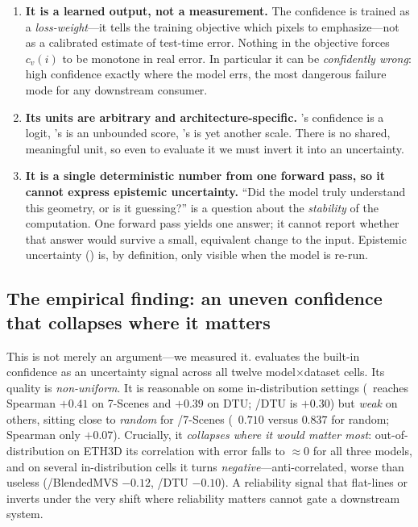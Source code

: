 \begin{enumerate}[leftmargin=1.5em,itemsep=2pt,topsep=2pt]
\item \textbf{It is a learned output, not a measurement.} The confidence is trained as a
\emph{loss-weight}---it tells the training objective which pixels to emphasize---not as a calibrated
estimate of test-time error. Nothing in the objective forces $c_v(i)$ to be monotone in real error.
In particular it can be \emph{confidently wrong}: high confidence exactly where the model errs, the
most dangerous failure mode for any downstream consumer.
\item \textbf{Its units are arbitrary and architecture-specific.} \pii's confidence is a logit,
\mastr's is an unbounded score, \vggt's is yet another scale. There is no shared, meaningful unit, so
even to evaluate it we must invert it into an uncertainty.
\item \textbf{It is a single deterministic number from one forward pass, so it cannot express
epistemic uncertainty.} ``Did the model truly understand this geometry, or is it guessing?'' is a
question about the \emph{stability} of the computation. One forward pass yields one answer; it cannot
report whether that answer would survive a small, equivalent change to the input. Epistemic
uncertainty () is, by definition, only visible when the model is
re-run.
\end{enumerate}

\subsection{The empirical finding: an uneven confidence that collapses where it matters}
\label{sec:problem-rq1}

This is not merely an argument---we measured it.  evaluates the built-in confidence as
an uncertainty signal across all twelve model$\times$dataset cells. Its quality is \emph{non-uniform}.
It is reasonable on some in-distribution settings (\pii\ reaches Spearman ${+}0.41$ on 7-Scenes and
${+}0.39$ on DTU; \vggt/DTU is ${+}0.30$) but \emph{weak} on others, sitting close to \emph{random}
for \vggt/7-Scenes (\ause\ $0.710$ versus $0.837$ for random; Spearman only ${+}0.07$). Crucially, it
\emph{collapses where it would matter most}: out-of-distribution on ETH3D its correlation with error
falls to $\approx 0$ for all three models, and on several in-distribution cells it turns
\emph{negative}---anti-correlated, worse than useless (\vggt/BlendedMVS $-0.12$, \mastr/DTU $-0.10$).
A reliability signal that flat-lines or inverts under the very shift where reliability matters cannot
gate a downstream system.


